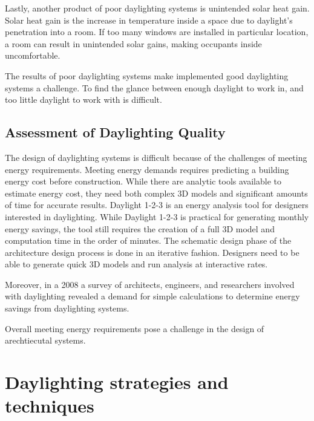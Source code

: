 Lastly, another product of poor daylighting systems is unintended solar heat gain. Solar heat gain is the increase in temperature inside a space due to daylight's penetration into a room. If too many windows are installed in particular location, a room can result in unintended solar gains, making occupants inside uncomfortable.

The results of poor daylighting systems make implemented good daylighting systems a challenge. To find the glance between enough daylight to work in, and too little daylight to work with is difficult.

\subsection{Assessment of Daylighting Quality}


The design of daylighting systems is difficult because of the challenges of meeting energy requirements.
Meeting energy demands requires predicting a building energy cost before construction.
While there are analytic tools available to estimate energy cost, they need both complex 3D models and significant amounts of time for accurate results.
Daylight 1-2-3 is an energy analysis tool for designers interested in daylighting.
While Daylight 1-2-3 is practical for generating monthly energy savings, the tool still requires the creation of a full 3D model and computation time in the order of minutes. \cite{Reinhart}
The schematic design phase of the architecture design process is done in an iterative fashion.
Designers need to be able to generate quick 3D models and run analysis at interactive rates.

Moreover, in a 2008 a survey of architects, engineers, and researchers involved with daylighting revealed a demand for simple calculations to determine energy savings from daylighting systems.\cite{Galasiu}

Overall meeting energy requirements pose a challenge in the design of arechtiecutal systems.

\section{Daylighting strategies and techniques}

